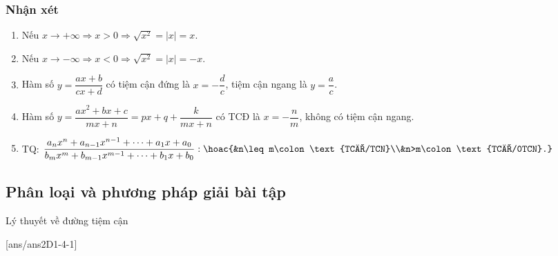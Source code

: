 \subsubsection{Nhận xét}
\begin{enumerate}[1.]
\item Nếu $x\to+\infty\Rightarrow x>0\Rightarrow\sqrt{x^2}=|x|=x$.
\item Nếu $x\to-\infty\Rightarrow x<0\Rightarrow\sqrt{x^2}=|x|=-x$.
\item Hàm số $y=\dfrac{ax+b}{cx+d}$ có tiệm cận đứng là $x=-\dfrac{d}{c}$, tiệm cận ngang là $y=\dfrac{a}{c}$.
\item Hàm số $y=\dfrac{ax^2+bx+c}{mx+n}=px+q+\dfrac{k}{mx+n}$ có TCĐ là $x=-\dfrac{n}{m}$, không có tiệm cận ngang.
\item TQ: $\dfrac{a_nx^n+a_{n-1}x^{n-1}+\cdots +a_1x+a_0}{b_mx^m+b_{m-1}x^{m-1}+\cdots +b_1x+b_0}:\hoac{&n\leq m\colon \text{TCĐ/TCN}\\&n>m\colon \text{TCĐ/0TCN}.}$
\end{enumerate}
\subsection{Phân loại và phương pháp giải bài tập}
\begin{dang}{Lý thuyết về đường tiệm cận}
\end{dang}
[ans/ans2D1-4-1]
